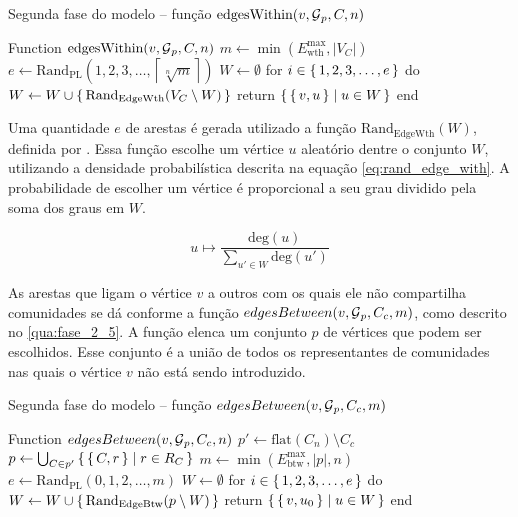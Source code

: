 \documentclass[notes.tex]{subfiles}
\begin{document}
\begin{quadro}[htbp]
\caption{Segunda fase do modelo -- função $\text{edgesWithin}(v, \operatorname{\mathcal{G}}_p, C, n)$}
\label{qua:fase_2_4}
\begin{algorithm}
Function $\text{edgesWithin}(v, \operatorname{\mathcal{G}}_p, C, n)$
    $m \leftarrow \min( E_\text{wth}^\text{max}, |V_C| )$
    $e \leftarrow \text{Rand}_\text{PL}({1, 2, 3, \ldots, \left\lceil  \sqrt[n]{m} \right\rceil})$
    $W \leftarrow \emptyset$
    for $i \in \set{1, 2, 3, \ldots, e}$ do $W\leftarrow W \cup \set{\text{Rand}_\text{EdgeWth}(V_C \setminus W)}$
    return $\set{\set{v, u} | u \in W}$
end
\end{algorithm}
\end{quadro}

Uma quantidade $e$ de arestas é gerada utilizado a função $\text{Rand}_\text{EdgeWth}(W)$, definida por .
Essa função escolhe um vértice $u$ aleatório dentre o conjunto $W$, utilizando a densidade probabilística descrita na equação \ref{eq:rand_edge_with}.
A probabilidade de escolher um vértice é proporcional a seu grau dividido pela soma dos graus em $W$.

\begin{equation}\label{eq:rand_edge_with}
    u \mapsto \frac{\text{deg}(u)}{\displaystyle\sum_{u' \in W}^{}\text{deg}(u')}
\end{equation}

As arestas que ligam o vértice $v$ a outros com os quais ele não compartilha comunidades se dá conforme a função $edgesBetween(v, \operatorname{\mathcal{G}}_p, C_c, m)$, como descrito no \autoref{qua:fase_2_5}.
A função elenca um conjunto $p$ de vértices que podem ser escolhidos.
Esse conjunto é a união de todos os representantes de comunidades nas quais o vértice $v$ não está sendo introduzido.

\begin{quadro}[htbp]
\caption{Segunda fase do modelo -- função $edgesBetween(v, \operatorname{\mathcal{G}}_p, C_c, m)$}
\label{qua:fase_2_5}
\begin{algorithm}
Function $edgesBetween(v, \operatorname{\mathcal{G}}_p, C_c, n)$
    $p' \leftarrow \text{flat}(C_n)\setminus C_c$
    $p \leftarrow \bigcup_{C \in p'} \set{\set{C, r} | r \in R_C }$
    $m \leftarrow \min( E_\text{btw}^\text{max}, |p|, n)$
    $e \leftarrow \text{Rand}_\text{PL}({0, 1, 2, \ldots, m})$
    $W \leftarrow \emptyset$
    for $i \in \set{1, 2, 3, \ldots, e}$ do $W\leftarrow W \cup \set{\text{Rand}_\text{EdgeBtw}(p \setminus W)}$
    return $\set{\set{v, u_0} | u \in W}$
end
\end{algorithm}
\end{quadro}
\end{document}

